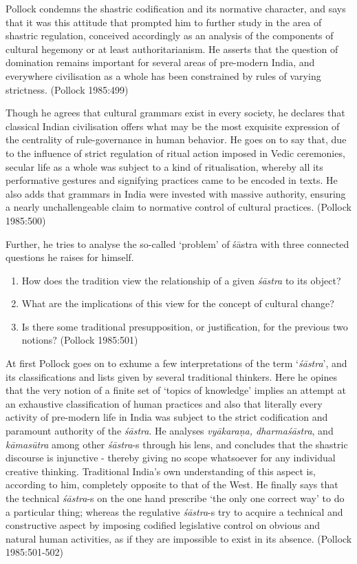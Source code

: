 Pollock condemns the shastric codification and its normative character, and says that it was this attitude that prompted him to further study in the area of shastric regulation, conceived accordingly as an analysis of the components of cultural hegemony or at least authoritarianism. He asserts that the question of domination remains important for several areas of pre-modern India, and everywhere civilisation as a whole has been constrained by rules of varying strictness. (Pollock 1985:499)

Though he agrees that cultural grammars exist in every society, he declares that classical Indian civilisation offers what may be the most exquisite expression of the centrality of rule-governance in human behavior. He goes on to say that, due to the influence of strict regulation of ritual action imposed in Vedic ceremonies, secular life as a whole was subject to a kind of ritualisation, whereby all its performative gestures and signifying practices came to be encoded in texts. He also adds that grammars in India were invested with massive authority, ensuring a nearly unchallengeable claim to normative control of cultural practices. (Pollock 1985:500)

Further, he tries to analyse the so-called `problem' of śāstra with three connected questions he raises for himself.
\begin{enumerate}
\item How does the tradition view the relationship of a given {\it śāstra} to its object?

\newpage

\item What are the implications of this view for the concept of cultural change?

\item Is there some traditional presupposition, or justification, for the previous two notions? (Pollock 1985:501)
\end{enumerate}

At first Pollock goes on to exhume a few interpretations of the term `{\it śāstra}', and its classifications and lists given by several traditional thinkers. Here he opines that the very notion of a finite set of `topics of knowledge' implies an attempt at an exhaustive classification of human practices and also that literally every activity of pre-modern life in India was subject to the strict codification and paramount authority of the {\it śāstra}. He analyses \textit{vyākaraṇa, dharmaśāstra}, and {\it kāmasūtra} among other {\it śāstra}-s through his lens, and concludes that the shastric discourse is injunctive - thereby giving no scope whatsoever for any individual creative thinking. Traditional India's own understanding of this aspect is, according to him, completely opposite to that of the West. He finally says that the technical {\it śāstra}-s on the one hand prescribe `the only one correct way' to do a particular thing;  whereas the regulative {\it śāstra}-s try to acquire a technical and constructive aspect by imposing codified legislative control on obvious and natural human activities, as if they are impossible to exist in its absence. (Pollock 1985:501-502)

